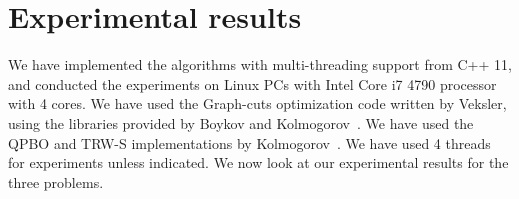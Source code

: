 \section{Experimental results}
\label{section:results} We have implemented the algorithms with
multi-threading support from C++ 11, and conducted the experiments on
Linux PCs with Intel Core i7 4790 processor with 4 cores. We have used
the Graph-cuts optimization code written by Veksler, using the libraries
provided by Boykov and
Kolmogorov~\cite{middlebury_mrf,alpha_expansion,what_energy_can_be_min_by_gc,mrf_experimental}.
%
%
We have used the QPBO and TRW-S implementations by
Kolmogorov~\cite{QPBO, TRW-S}. We have used 4 threads
for experiments unless indicated. We now look at our experimental
results for the three problems.










